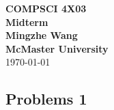 \documentclass[11pt,fleqn]{exam}
\begin{document}
	
\begin{center}
	{\large \textbf{COMPSCI 4X03}}\\[2mm]
	{\huge \textbf{Midterm}}\\[6mm]
	{\large \textbf{Mingzhe Wang}}\\[2mm]
	{\large \textbf{McMaster University}}\\[6mm]
	{\large \today}
		
\end{center}
	
\medskip




%


		
\subsection*{Problems 1}
\end{document}
